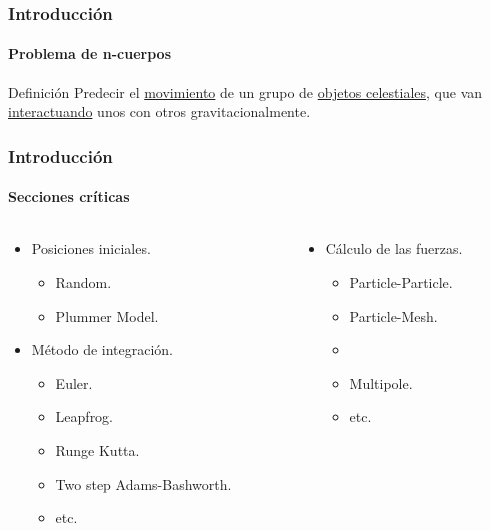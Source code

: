 \frame
{
\frametitle{Introducción}
\framesubtitle{Problema de n-cuerpos}
\begin{block}{Definición}
    Predecir el \underline{movimiento} de un grupo de \underline{objetos celestiales},
    que van \underline{interactuando} unos con otros gravitacionalmente.
\end{block}
}

\frame
{
\frametitle{Introducción}
\framesubtitle{Secciones críticas}
\begin{columns}
    \begin{column}{0.5\textwidth}
        \begin{itemize}
            \item Posiciones iniciales.
            \begin{itemize}
                \item Random.
                \item Plummer Model.
            \end{itemize}
            \item Método de integración.
            \begin{itemize}
                \item Euler.
                \item Leapfrog.
                \item Runge Kutta.
                \item Two step Adams-Bashworth.
                \item etc.
            \end{itemize}
        \end{itemize}
    \end{column}
    \begin{column}{0.5\textwidth}
        \begin{itemize}
            \item Cálculo de las fuerzas.
            \begin{itemize}
                \item Particle-Particle. 
                \item Particle-Mesh.  
                \item {} 
                \item Multipole. 
                \item etc.
            \end{itemize}
        \end{itemize}
    \end{column}
\end{columns}
}


